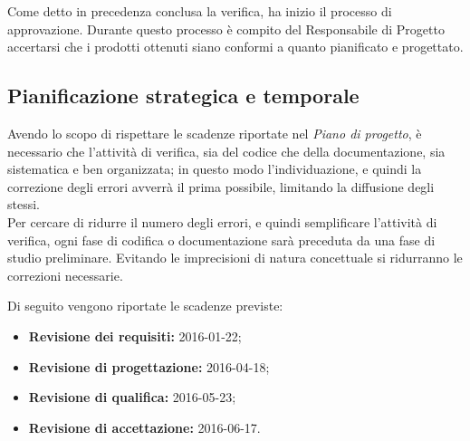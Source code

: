 \documentclass[a4paper]{article}
\begin{document}
			Come detto in precedenza conclusa la verifica, ha inizio il processo di approvazione. Durante questo processo è compito 
			del Responsabile di Progetto accertarsi che i prodotti ottenuti siano conformi a quanto pianificato e progettato.
		
		
		\subsection{Pianificazione strategica e temporale}
			Avendo lo scopo di rispettare le scadenze riportate nel \emph{Piano di progetto}, è necessario che l'attività 
			di verifica, sia del codice che della documentazione, sia sistematica e ben organizzata; in questo modo 
			l'individuazione, e quindi la correzione degli errori avverrà il prima possibile, limitando la diffusione 
			degli stessi.\\
			Per cercare di ridurre il numero degli errori, e quindi semplificare l'attività di verifica, ogni fase 
			di codifica o documentazione sarà preceduta da una fase di studio preliminare. Evitando le imprecisioni 
			di natura concettuale si ridurranno le correzioni necessarie.
			
			Di seguito vengono riportate le scadenze previste:
			\begin{itemize}
				\item \textbf{Revisione dei requisiti:} 2016-01-22;
				\item \textbf{Revisione di progettazione:} 2016-04-18;
				\item \textbf{Revisione di qualifica:} 2016-05-23;
				\item \textbf{Revisione di accettazione:} 2016-06-17.
			\end{itemize}
\end{document}

